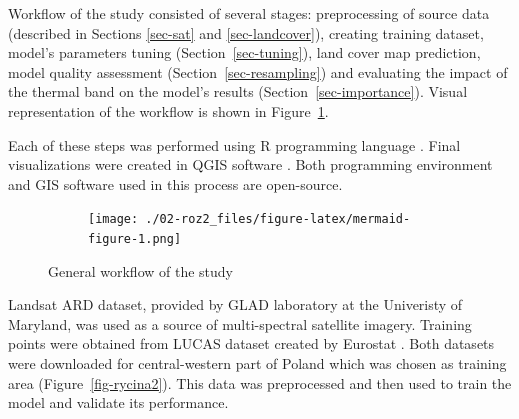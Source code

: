 \documentclass{amuthesis}
\begin{document}
Workflow of the study consisted of several stages: preprocessing of
source data (described in Sections \ref{sec-sat} and
\ref{sec-landcover}), creating training dataset, model's parameters
tuning (Section~\ref{sec-tuning}), land cover map prediction, model
quality assessment (Section~\ref{sec-resampling}) and evaluating the
impact of the thermal band on the model's results
(Section~\ref{sec-importance}). Visual representation of the workflow is
shown in Figure~\ref{fig-rycina1}.

Each of these steps was performed using R programming language
\autocite{R-base}. Final visualizations were created in QGIS software
\autocite{qgis_development_team_qgis_2009}. Both programming environment
and GIS software used in this process are open-source.

\begin{figure}

{\centering 

\begin{figure}[H]

{\centering \texttt{[image: ./02-roz2\_files/figure-latex/mermaid-figure-1.png]}

}

\end{figure}

}

\caption{\label{fig-rycina1}General workflow of the study}

\end{figure}

Landsat ARD dataset, provided by GLAD laboratory at the Univeristy of
Maryland, was used as a source of multi-spectral satellite imagery.
Training points were obtained from LUCAS dataset created by Eurostat
\autocite{dandrimont_harmonised_2020}. Both datasets were downloaded for
central-western part of Poland which was chosen as training area
(Figure~\ref{fig-rycina2}). This data was preprocessed and then used to
train the model and validate its performance.
\end{document}

